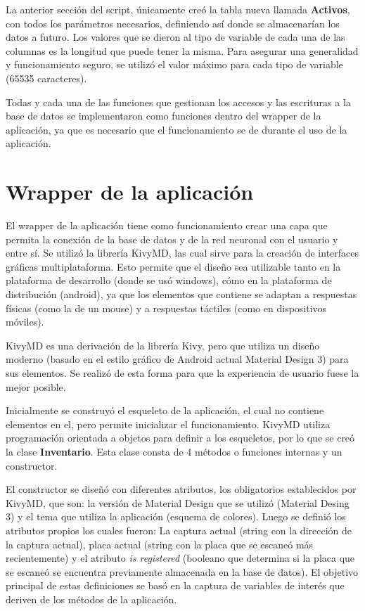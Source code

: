 La anterior sección del script, únicamente creó la tabla nueva llamada \textbf{Activos}, con todos los parámetros necesarios, definiendo así donde se almacenarían los datos a futuro. Los valores que se dieron al tipo de variable de cada una de las columnas es la longitud que puede tener la misma. Para asegurar una generalidad y funcionamiento seguro, se utilizó el valor máximo para cada tipo de variable (65535 caracteres).
\par
Todas y cada una de las funciones que gestionan los accesos y las escrituras a la base de datos se implementaron como funciones dentro del wrapper de la aplicación, ya que es necesario que el funcionamiento se de durante el uso de la aplicación. 




\section{Wrapper de la aplicación}
 El wrapper de la aplicación tiene como funcionamiento crear una capa que permita la conexión de la base de datos y de la red neuronal con el usuario y entre sí. Se utilizó la librería KivyMD, las cual sirve para la creación de interfaces gráficas multiplataforma. Esto permite que el diseño sea utilizable tanto en la plataforma de desarrollo (donde se usó windows), cómo en la plataforma de distribución (android), ya que los elementos que contiene se adaptan a respuestas físicas (como la de un mouse) y a respuestas táctiles (como en dispositivos móviles).
 \par
 KivyMD es una derivación de la librería Kivy, pero que utiliza un diseño moderno (basado en el estilo gráfico de Android actual Material Design 3) para sus elementos. Se realizó de esta forma para que la experiencia de usuario fuese la mejor posible. 
\par
 Inicialmente se construyó el esqueleto de la aplicación, el cual no contiene elementos en el, pero permite inicializar el funcionamiento. KivyMD utiliza programación orientada a objetos para definir a los esqueletos, por lo que se creó la clase \textbf{Inventario}. Esta clase consta de 4 métodos o funciones internas y un constructor. 
 \par
 El constructor se diseñó con diferentes atributos, los obligatorios establecidos por KivyMD, que son: la versión de Material Design que se utilizó (Material Desing 3) y el tema que utiliza la aplicación (esquema de colores). Luego se definió los atributos propios los cuales fueron: La captura actual (string con la dirección de la captura actual), placa actual (string con la placa que se escaneó más recientemente) y el atributo \textit{is registered} (booleano que determina si la placa que se escaneó se encuentra previamente almacenada en la base de datos). El objetivo principal de estas definiciones se basó en la captura de variables de interés que deriven de los métodos de la aplicación.

